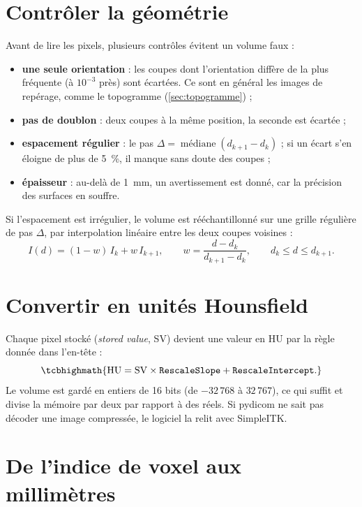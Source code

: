 \section{Contrôler la géométrie}

Avant de lire les pixels, plusieurs contrôles évitent un volume faux :
\begin{itemize}
  \item \textbf{une seule orientation} : les coupes dont l'orientation diffère de la plus fréquente (à $10^{-3}$ près)
  sont écartées. Ce sont en général les images de repérage, comme le topogramme (\cref{sec:topogramme}) ;
  \item \textbf{pas de doublon} : deux coupes à la même position, la seconde est écartée ;
  \item \textbf{espacement régulier} : le pas $\Delta = \operatorname{médiane}(d_{k+1} - d_k)$ ; si un écart s'en
  éloigne de plus de 5~\%, il manque sans doute des coupes ;
  \item \textbf{épaisseur} : au-delà de 1~mm, un avertissement est donné, car la précision des surfaces en souffre.
\end{itemize}

Si l'espacement est irrégulier, le volume est rééchantillonné sur une grille régulière de pas $\Delta$, par
interpolation linéaire entre les deux coupes voisines :
\begin{equation}
  I(d) = (1 - w)\, I_k + w\, I_{k+1},
  \qquad
  w = \frac{d - d_k}{d_{k+1} - d_k},
  \qquad d_k \le d \le d_{k+1}.
\end{equation}

\section{Convertir en unités Hounsfield}

Chaque pixel stocké (\emph{stored value}, SV) devient une valeur en HU par la règle donnée dans l'en-tête :
\begin{equation}
  \tcbhighmath{\mathrm{HU} = \mathrm{SV} \times \texttt{RescaleSlope} + \texttt{RescaleIntercept}.}
\end{equation}
Le volume est gardé en entiers de 16 bits (de $-32\,768$ à $32\,767$), ce qui suffit et divise la mémoire par deux par
rapport à des réels. Si pydicom ne sait pas décoder une image compressée, le logiciel la relit avec SimpleITK.

\section{De l'indice de voxel aux millimètres}
\label{sec:affine}

